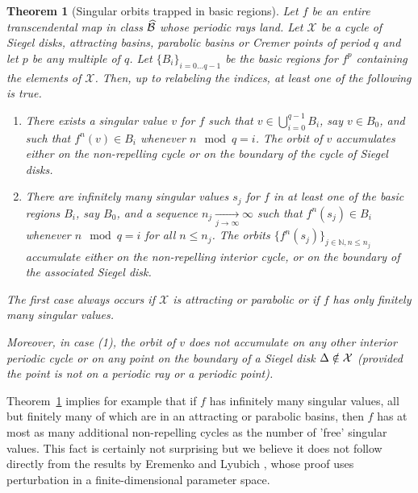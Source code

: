 \documentclass[11pt, twoside]{article}
\newtheorem{thm}{Theorem}[section]
\theoremstyle{definition}
\newcommand{\N}{\mathbb{N}}
\newcommand{\BB}{{\cal B}}
\newcommand{\XX}{{\cal X}}
\newcommand{\BBhat}{\widehat{\BB}}
\begin{document}
\begin{thm}[Singular orbits trapped in basic regions]\label{Singular orbits trapped in basic regions}
 Let $f$ be an entire transcendental map in class $\BBhat$ whose periodic  rays land.   
Let $\mathcal{X}$ be a cycle of Siegel disks, attracting basins, parabolic basins or Cremer points of period $q$ and let $p$ be any multiple of $q$.  Let $\{B_i\}_{i=0\ldots q-1}$ be the basic regions for $f^p$ containing the elements of $\mathcal{X}$. Then, up to relabeling the indices, at least one of the following is true.
\begin{enumerate}
\item[\rm (1)] There exists a singular value $v$ for $f$ such that $v\in \bigcup_{i=0}^{q-1} B_i$, say $v\in B_0$, and such that $f^{n}(v)\in B_i$ whenever $n\mod q=i$. The orbit of $v$ accumulates either on the non-repelling cycle or on the boundary of the cycle of Siegel disks.

\item[\rm (2)]   There are infinitely many singular values $s_j$ for $f$ in at least one of the basic regions $B_i$, say $B_0$, and  a sequence $ n_j \underset{j\to\infty}{\longrightarrow}  \infty$ such that      $f^{n}(s_j)\in B_i$ whenever   $n\mod q=i$  for all $n\leq n_j $.  The orbits $\{f^{n}(s_j)\}_{j\in\N, n\leq n_j}$ accumulate either    on  the non-repelling interior cycle, or on the boundary of the associated Siegel disk. 
\end{enumerate}
The first case always occurs if $\mathcal{X}$ is attracting or parabolic or if $f$ has only  finitely many singular values. 

Moreover, in case (1), the orbit of $v$ does not accumulate on any other interior periodic cycle or  on any point on  the boundary of a Siegel disk $\Delta\notin \XX$ (provided the point is not on a periodic ray or a periodic point). 

\end{thm}
 
  Theorem~\ref{Singular orbits trapped in basic regions}  implies for example that if $f$ has infinitely many singular values, all but finitely many of which are in an attracting or parabolic basins, then $f$ has at most as many additional non-repelling cycles as the number of 'free' singular values.  
This fact is certainly not surprising but we believe it does not follow directly from the results by Eremenko and Lyubich \cite{EL92}, whose proof  uses perturbation in a finite-dimensional parameter space.  
\end{document}
